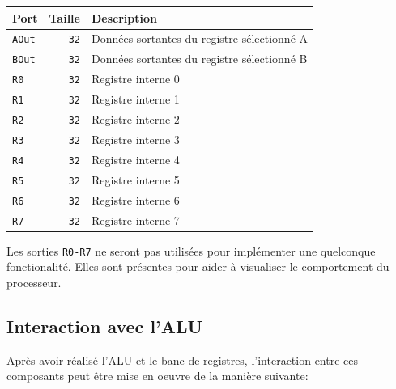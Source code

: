 \documentclass{article}
\begin{document}
    \begin{tabular}{|l|r|l|}
        \hline
        \textbf{Port}  & \textbf{Taille} & \textbf{Description}                        \\
        \hline

        \texttt{AOut} & \texttt{32}     & Données sortantes du registre sélectionné A \\
        \hline
        \texttt{BOut} & \texttt{32}     & Données sortantes du registre sélectionné B \\
        \hline
        \texttt{R0}   & \texttt{32}     & Registre interne 0                          \\
        \hline
        \texttt{R1}   & \texttt{32}     & Registre interne 1                          \\
        \hline
        \texttt{R2}   & \texttt{32}     & Registre interne 2                          \\
        \hline
        \texttt{R3}   & \texttt{32}     & Registre interne 3                          \\
        \hline
        \texttt{R4}   & \texttt{32}     & Registre interne 4                          \\
        \hline
        \texttt{R5}   & \texttt{32}     & Registre interne 5                          \\
        \hline
        \texttt{R6}   & \texttt{32}     & Registre interne 6                          \\
        \hline
        \texttt{R7}   & \texttt{32}     & Registre interne 7                          \\

        \hline
    \end{tabular}

    Les sorties \texttt{R0-R7} ne seront pas utilisées pour implémenter une quelconque fonctionalité.
    Elles sont présentes pour aider à visualiser le comportement du processeur.

    \subsection{Interaction avec l'ALU}

    Après avoir réalisé l'ALU et le banc de registres, l'interaction entre ces composants peut être mise en oeuvre de la manière suivante:
\end{document}
